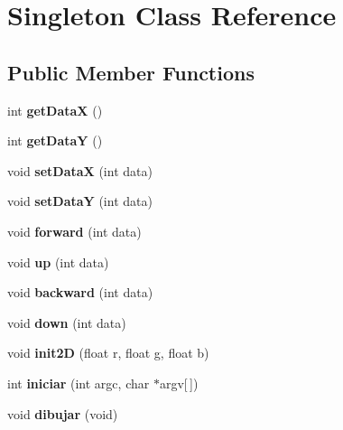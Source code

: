 \hypertarget{classSingleton}{}\section{Singleton Class Reference}
\label{classSingleton}
\subsection*{Public Member Functions}
\begin{DoxyCompactItemize}
\item 
int {\bfseries get\+DataX} ()\hypertarget{classSingleton_aa6acbbd88c1f6f2cf2f1c76fbd1d2c7c}{}\label{classSingleton_aa6acbbd88c1f6f2cf2f1c76fbd1d2c7c}

\item 
int {\bfseries get\+DataY} ()\hypertarget{classSingleton_a281dcd5bd9e352a5c2a8dfebe097edd3}{}\label{classSingleton_a281dcd5bd9e352a5c2a8dfebe097edd3}

\item 
void {\bfseries set\+DataX} (int data)\hypertarget{classSingleton_a9d1bdb39cc9aee060944f29a50771078}{}\label{classSingleton_a9d1bdb39cc9aee060944f29a50771078}

\item 
void {\bfseries set\+DataY} (int data)\hypertarget{classSingleton_a770e81eceb73a55cc9f9d49c4f6b7ba2}{}\label{classSingleton_a770e81eceb73a55cc9f9d49c4f6b7ba2}

\item 
void {\bfseries forward} (int data)\hypertarget{classSingleton_ada23482f571bfbc69b3c8774799ee82c}{}\label{classSingleton_ada23482f571bfbc69b3c8774799ee82c}

\item 
void {\bfseries up} (int data)\hypertarget{classSingleton_a5855482c552d8c55f492d299e892653e}{}\label{classSingleton_a5855482c552d8c55f492d299e892653e}

\item 
void {\bfseries backward} (int data)\hypertarget{classSingleton_af2d873672f4aaadf7fa376a23c9d7ee3}{}\label{classSingleton_af2d873672f4aaadf7fa376a23c9d7ee3}

\item 
void {\bfseries down} (int data)\hypertarget{classSingleton_a90fbe11c6ef1bd0bf3d69dd5e2121f9c}{}\label{classSingleton_a90fbe11c6ef1bd0bf3d69dd5e2121f9c}

\item 
void {\bfseries init2D} (float r, float g, float b)\hypertarget{classSingleton_a6d32ca6812aaf4758993892d841245d5}{}\label{classSingleton_a6d32ca6812aaf4758993892d841245d5}

\item 
int {\bfseries iniciar} (int argc, char $\ast$argv\mbox{[}$\,$\mbox{]})\hypertarget{classSingleton_a863c26bec8d7b7c830a9e6050b2d3089}{}\label{classSingleton_a863c26bec8d7b7c830a9e6050b2d3089}

\item 
void {\bfseries dibujar} (void)\hypertarget{classSingleton_a8533f46af547a3329d20fdbccc412e58}{}\label{classSingleton_a8533f46af547a3329d20fdbccc412e58}

\end{DoxyCompactItemize}
